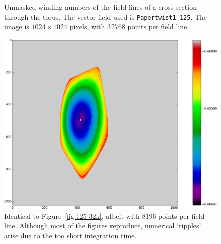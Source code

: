 \documentclass{article}
\begin{document}
\begin{figure}[!hb]
	\caption{Unmasked winding numbers of the field lines of a cross-section through the torus. The vector field used is \texttt{Papertwist1-125}. The image is $1024\times 1024$ pixels, with $32768$ points per field line.}\label{fig:125-unmasked}
\endminipage\hfill
{}
  \includegraphics[width=\linewidth]{Figures/Rings_Papertwist_twist1_125_steps8k.png}
	\caption{Identical to Figure~\ref{fig:125-32k}, albeit with $8196$ points per field line. Although most of the figures reproduce, numerical `ripples' arise due to the too short integration time.}\label{fig:125-8k}
\endminipage
\end{figure}

\FloatBarrier
\end{document}
